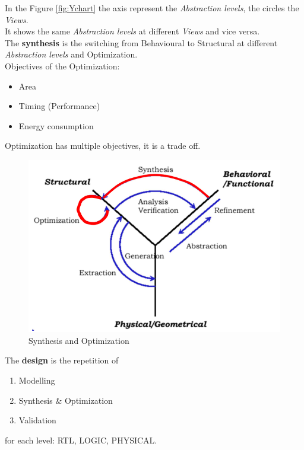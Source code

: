 In the Figure \ref{fig:Ychart} the axis represent the \textit{Abstraction levels}, the circles the \textit{Views}.\\
It shows the same \textit{Abstraction levels} at different \textit{Views} and vice versa.\\
The \textbf{synthesis} is the switching from Behavioural to Structural at different \textit{Abstraction levels} and Optimization.\\
Objectives of the Optimization:
\begin{itemize}
\item Area
\item Timing (Performance)
\item Energy consumption
\end{itemize}
Optimization has multiple objectives, it is a trade off.
\begin{figure}[H]
	\centering
	\includegraphics[height=70 mm]{./Cap1/Images/Image03.png}
	\caption[Optional caption]{Synthesis and Optimization}
	\label{fig:SynthOpt}
\end{figure}
\begin{flushleft}
	The \textbf{design} is the repetition of
\end{flushleft}
\begin{enumerate}
\item Modelling
\item Synthesis \& Optimization
\item Validation
\end{enumerate}
for each level: RTL, LOGIC, PHYSICAL.

